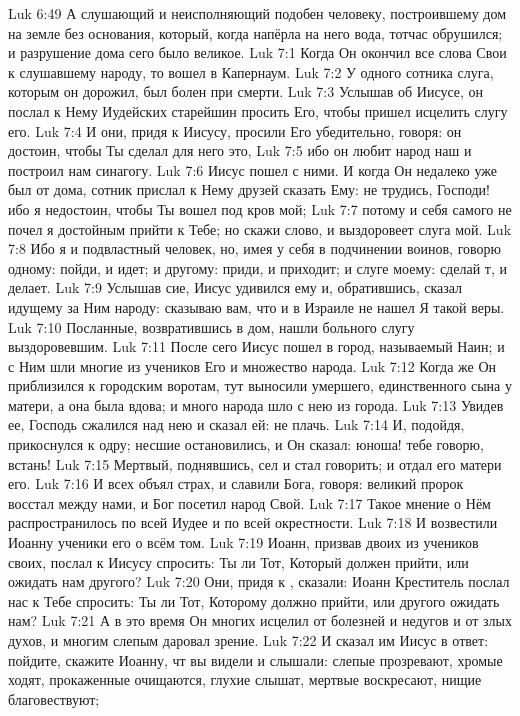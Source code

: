 \vs Luk 6:49 А слушающий и неисполняющий подобен человеку, построившему дом на земле без основания, который, когда напёрла на него вода, тотчас обрушился; и разрушение дома сего было великое.
\vs Luk 7:1 Когда Он окончил все слова Свои к слушавшему народу, то вошел в Капернаум.
\vs Luk 7:2 У одного сотника слуга, которым он дорожил, был болен при смерти.
\vs Luk 7:3 Услышав об Иисусе, он послал к Нему Иудейских старейшин просить Его, чтобы пришел исцелить слугу его.
\vs Luk 7:4 И они, придя к Иисусу, просили Его убедительно, говоря: он достоин, чтобы Ты сделал для него это,
\vs Luk 7:5 ибо он любит народ наш и построил нам синагогу.
\vs Luk 7:6 Иисус пошел с ними. И когда Он недалеко уже был от дома, сотник прислал к Нему друзей сказать Ему: не трудись, Господи! ибо я недостоин, чтобы Ты вошел под кров мой;
\vs Luk 7:7 потому и себя самого не почел я достойным прийти к Тебе; но скажи слово, и выздоровеет слуга мой.
\vs Luk 7:8 Ибо я и подвластный человек, но, имея у себя в подчинении воинов, говорю одному: пойди, и идет; и другому: приди, и приходит; и слуге моему: сделай т, и делает.
\vs Luk 7:9 Услышав сие, Иисус удивился ему и, обратившись, сказал идущему за Ним народу: сказываю вам, что и в Израиле не нашел Я такой веры.
\vs Luk 7:10 Посланные, возвратившись в дом, нашли больного слугу выздоровевшим.
\rsbpar\vs Luk 7:11 После сего Иисус пошел в город, называемый Наин; и с Ним шли многие из учеников Его и множество народа.
\vs Luk 7:12 Когда же Он приблизился к городским воротам, тут выносили умершего, единственного сына у матери, а она была вдова; и много народа шло с нею из города.
\vs Luk 7:13 Увидев ее, Господь сжалился над нею и сказал ей: не плачь.
\vs Luk 7:14 И, подойдя, прикоснулся к одру; несшие остановились, и Он сказал: юноша! тебе говорю, встань!
\vs Luk 7:15 Мертвый, поднявшись, сел и стал говорить; и отдал его  матери его.
\vs Luk 7:16 И всех объял страх, и славили Бога, говоря: великий пророк восстал между нами, и Бог посетил народ Свой.
\vs Luk 7:17 Такое мнение о Нём распространилось по всей Иудее и по всей окрестности.
\rsbpar\vs Luk 7:18 И возвестили Иоанну ученики его о всём том.
\vs Luk 7:19 Иоанн, призвав двоих из учеников своих, послал к Иисусу спросить: Ты ли Тот, Который должен прийти, или ожидать нам другого?
\vs Luk 7:20 Они, придя к , сказали: Иоанн Креститель послал нас к Тебе спросить: Ты ли Тот, Которому должно прийти, или другого ожидать нам?
\vs Luk 7:21 А в это время Он многих исцелил от болезней и недугов и от злых духов, и многим слепым даровал зрение.
\vs Luk 7:22 И сказал им Иисус в ответ: пойдите, скажите Иоанну, чт вы видели и слышали: слепые прозревают, хромые ходят, прокаженные очищаются, глухие слышат, мертвые воскресают, нищие благовествуют;

